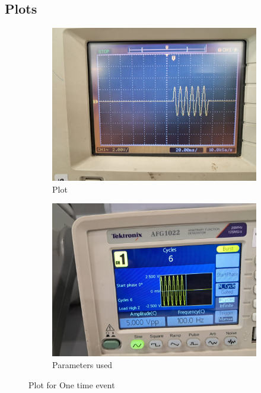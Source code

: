 \documentclass[a4paper,12pt]{article}
\begin{document}
\subsection{Plots}
\begin{figure}[htbp]
    \centering
    \begin{subfigure}[b]{0.45\textwidth}
        \centering
        \includegraphics[width=\linewidth]{figs/onetimeplot.jpeg}
        \caption{Plot}
        \label{fig:image1}
    \end{subfigure}
    \hfill
    \begin{subfigure}[b]{0.45\textwidth}
        \centering
        \includegraphics[width=\linewidth]{figs/onetime.jpeg}
        \caption{Parameters used}
        \label{fig:image2}
    \end{subfigure}
    \caption{Plot for One time event}
    \label{fig:sidebyside}
\end{figure}
\end{document}
